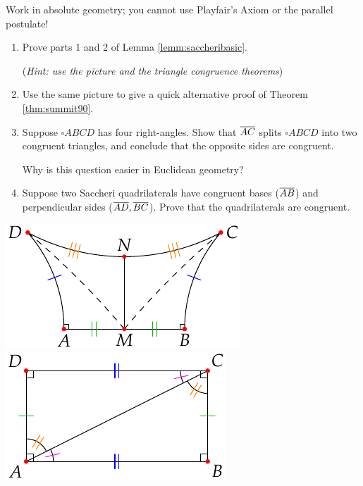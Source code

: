 \begin{exercises}
	Work in absolute geometry; you cannot use Playfair's Axiom or the parallel postulate!
	
	\begin{minipage}[t]{0.64\linewidth}\vspace{-2pt}
		\begin{enumerate}
		  \item Prove parts 1 and 2 of Lemma \ref{lemm:saccheribasic}.\par
		  (\emph{Hint: use the picture and the triangle congruence theorems})
		  
			\item Use the same picture to give a quick alternative proof of Theorem \ref{thm:summit90}.
		
			\item\label{exs:rectanglesplit} Suppose $\square ABCD$ has four right-angles. Show that $\overline{AC}$ splits $\square ABCD$ into two congruent triangles, and conclude that the opposite sides are congruent.\par
			Why is this question easier in Euclidean geometry?
	
			\item\label{exs:saccherisplit} Suppose two Saccheri quadrilaterals have congruent bases ($\overline{AB}$) and perpendicular sides ($\overline{AD},\overline{BC}$). Prove that the quadrilaterals are congruent.
		\end{enumerate}
	\end{minipage}
	\hfill
	\begin{minipage}[t]{0.35\linewidth}\vspace{-8pt}
		\flushright\includegraphics{history-saccheri2}\\
		\includegraphics{basic-rect}
	\end{minipage}
\end{exercises}


